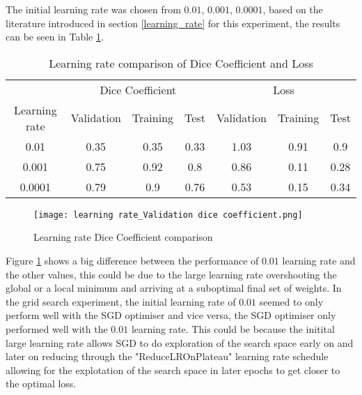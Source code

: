 The initial learning rate was chosen from $0.01$, $0.001$, $0.0001$, based on the literature introduced in section \ref{learning_rate} for this experiment, the results can be seen in Table \ref{tab_lr}.

\begin{table}[ht!] 
    \begin{center}
    \begin{tabular}{ccccccc} 
    \toprule
       & \multicolumn{3}{c}{Dice Coefficient}     & \multicolumn{3}{c}{Loss} \\
    Learning rate & Validation & Training & Test & Validation    & Training    & Test   \\ \midrule
    0.01 & 0.35 & 0.35 & 0.33 & 1.03 & 0.91 & 0.9  \\ 0.001 & 0.75 & 0.92 & 0.8 & 0.86 & 0.11 & 0.28  \\ \rowcolor{lightgray} 0.0001 & 0.79 & 0.9 & 0.76 & 0.53 & 0.15 & 0.34  \\
\bottomrule
    \end{tabular}
  \end{center} 
  \caption{Learning rate comparison of Dice Coefficient and Loss}\label{tab_lr}
\end{table}
\begin{figure}[hbt!]

\centering
    \texttt{[image: learning rate\_Validation dice coefficient.png]}
    \caption{Learning rate Dice Coefficient comparison}
    \label{lr_dice}
\end{figure}

Figure \ref{lr_dice} shows a big difference between the performance of $0.01$ learning rate and the other values, this could be due to the large learning rate overshooting the global or a local minimum and arriving at a suboptimal final set of weights.
In the grid search experiment, the initial learning rate of $0.01$ seemed to only perform well with the \gls{SGD} optimiser and vice versa, the \gls{SGD}  optimiser only performed well with the $0.01$ learning rate. This could be because the initital large learning rate allows SGD to do exploration of the search space early on and later on reducing through the "ReduceLROnPlateau" learning rate schedule allowing for the explotation of the search space in later epochs to get closer to the optimal loss.

